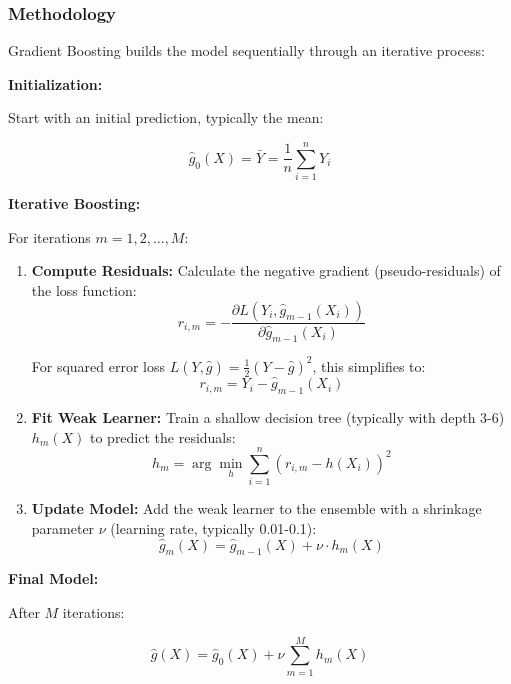 \documentclass[12pt,a4paper]{article}
\begin{document}
\subsubsection{Methodology}

Gradient Boosting builds the model sequentially through an iterative process:

\textbf{Initialization:}

Start with an initial prediction, typically the mean:

\begin{equation}
\hat{g}_0(X) = \bar{Y} = \frac{1}{n} \sum_{i=1}^{n} Y_i
\end{equation}

\textbf{Iterative Boosting:}

For iterations $m = 1, 2, \ldots, M$:

\begin{enumerate}
\item \textbf{Compute Residuals:} Calculate the negative gradient (pseudo-residuals) of the loss function:
\begin{equation}
r_{i,m} = -\frac{\partial L(Y_i, \hat{g}_{m-1}(X_i))}{\partial \hat{g}_{m-1}(X_i)}
\end{equation}

For squared error loss $L(Y, \hat{g}) = \frac{1}{2}(Y - \hat{g})^2$, this simplifies to:
\begin{equation}
r_{i,m} = Y_i - \hat{g}_{m-1}(X_i)
\end{equation}

\item \textbf{Fit Weak Learner:} Train a shallow decision tree (typically with depth 3-6) $h_m(X)$ to predict the residuals:
\begin{equation}
h_m = \arg\min_{h} \sum_{i=1}^{n} (r_{i,m} - h(X_i))^2
\end{equation}

\item \textbf{Update Model:} Add the weak learner to the ensemble with a shrinkage parameter $\nu$ (learning rate, typically 0.01-0.1):
\begin{equation}
\hat{g}_m(X) = \hat{g}_{m-1}(X) + \nu \cdot h_m(X)
\end{equation}
\end{enumerate}

\textbf{Final Model:}

After $M$ iterations:

\begin{equation}
\hat{g}(X) = \hat{g}_0(X) + \nu \sum_{m=1}^{M} h_m(X)
\end{equation}
\end{document}
